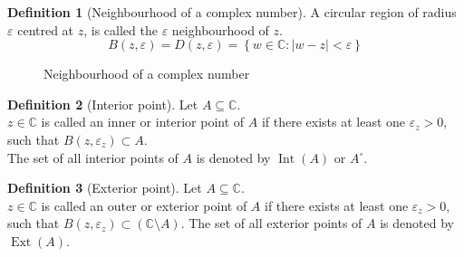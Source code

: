 \documentclass[titlepage, fleqn, a4paper, 12pt, twoside]{article}
\theoremstyle{definition}
\newtheorem{definition}{Definition}
\theoremstyle{theorem}
\DeclareMathOperator{\Int}{Int}
\DeclareMathOperator{\Ext}{Ext}
\begin{document}
\begin{definition}[Neighbourhood of a complex number]
	A circular region of radius $\varepsilon$ centred at $z$, is called the $\varepsilon$ neighbourhood of $z$.
	\begin{equation*}
		B(z,\varepsilon) = D(z,\varepsilon) = \left\{ w \in \mathbb{C} : |w - z| < \varepsilon \right\}
	\end{equation*}
	\begin{figure}[h]
		\centering
		\caption{Neighbourhood of a complex number}
	\end{figure}
\end{definition}

\begin{definition}[Interior point]
	Let $A \subseteq \mathbb{C}$.\\
	$z \in \mathbb{C}$ is called an inner or interior point of $A$ if there exists at least one $\varepsilon_z > 0$, such that $B(z,\varepsilon_z) \subset A$.\\
	The set of all interior points of $A$ is denoted by $\Int(A)$ or $A^{\circ}$.
\end{definition}

\begin{definition}[Exterior point]
	Let $A \subseteq \mathbb{C}$.\\
	$z \in \mathbb{C}$ is called an outer or exterior point of $A$ if there exists at least one $\varepsilon_z > 0$, such that $B(z,\varepsilon_z) \subset (\mathbb{C} \setminus A)$.
	The set of all exterior points of $A$ is denoted by $\Ext(A)$.
\end{definition}
\end{document}
